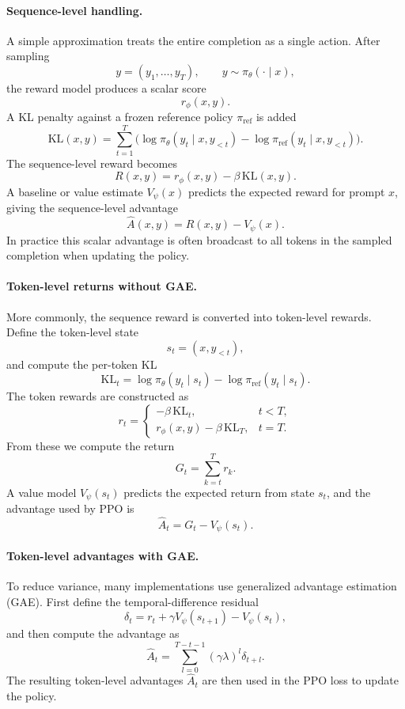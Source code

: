 \documentclass[11pt]{article}  %
\begin{document}
\paragraph{Sequence-level handling.}
A simple approximation treats the entire completion as a single action.  
After sampling
\[
  y=(y_1,\dots,y_T), \qquad y \sim \pi_\theta(\cdot \mid x),
\]
the reward model produces a scalar score
\[
  r_\phi(x,y).
\]
A KL penalty against a frozen reference policy $\pi_{\mathrm{ref}}$ is added
\[
  \mathrm{KL}(x,y)
  =
  \sum_{t=1}^{T}
  \bigl(
  \log \pi_\theta(y_t \mid x,y_{<t})
  -
  \log \pi_{\mathrm{ref}}(y_t \mid x,y_{<t})
  \bigr).
\]
The sequence-level reward becomes
\[
  R(x,y)=r_\phi(x,y)-\beta\,\mathrm{KL}(x,y).
\]
A baseline or value estimate $V_\psi(x)$ predicts the expected reward for prompt $x$, giving the sequence-level advantage
\[
  \hat A(x,y)=R(x,y)-V_\psi(x).
\]
In practice this scalar advantage is often broadcast to all tokens in the sampled completion when updating the policy.

\paragraph{Token-level returns without GAE.}
More commonly, the sequence reward is converted into token-level rewards.
Define the token-level state
\[
  s_t=(x,y_{<t}),
  \]
  and compute the per-token KL
  \[
  \mathrm{KL}_t
  =
  \log \pi_\theta(y_t \mid s_t)
  -
  \log \pi_{\mathrm{ref}}(y_t \mid s_t).
  \]
  The token rewards are constructed as
  \[
  r_t =
  \begin{cases}
  -\beta\,\mathrm{KL}_t, & t<T,\\
  r_\phi(x,y)-\beta\,\mathrm{KL}_T, & t=T.
  \end{cases}
\]
From these we compute the return
\[
  G_t=\sum_{k=t}^{T} r_k.
\]
A value model $V_\psi(s_t)$ predicts the expected return from state $s_t$, and the advantage used by PPO is
\[
  \hat A_t = G_t - V_\psi(s_t).
\]

\paragraph{Token-level advantages with GAE.}
To reduce variance, many implementations use generalized advantage estimation (GAE).
First define the temporal-difference residual
\[
  \delta_t = r_t + \gamma V_\psi(s_{t+1}) - V_\psi(s_t),
\]
and then compute the advantage as
\[
  \hat A_t =
  \sum_{l=0}^{T-t-1}
  (\gamma\lambda)^l
  \delta_{t+l}.
\]
The resulting token-level advantages $\hat A_t$ are then used in the PPO loss to update the policy.
\end{document}
